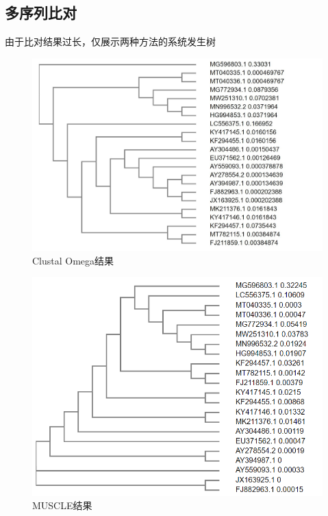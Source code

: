 \documentclass[supercite]{HustGraduPaper}
\begin{document}
	\subsection{多序列比对}由于比对结果过长，仅展示两种方法的系统发生树
	\begin{figure}[H]
		\centering
		\includegraphics[width=1\textwidth]{./material/practice3/clustal.jpg}
		\caption{Clustal Omega结果}
	\end{figure}
	\begin{figure}[H]
		\centering
		\includegraphics[width=1\textwidth]{./material/practice3/muscle.png}
		\caption{MUSCLE结果}
	\end{figure}
\end{document}
